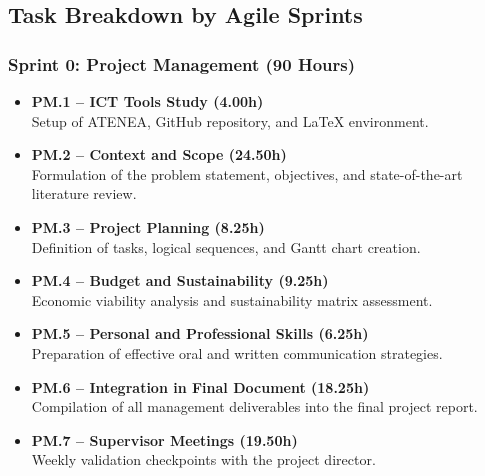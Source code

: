 \subsection{Task Breakdown by Agile Sprints}
\label{subsec:task-breakdown}

\newcommand{\taskitem}[3]{
    \item \textbf{#1 -- #2 (#3)} \\
    {\small #3}
}

\subsubsection*{Sprint 0: Project Management (90 Hours)}
\begin{itemize}[leftmargin=*, itemsep=4pt]
    \item \textbf{PM.1 -- ICT Tools Study (4.00h)} \\
    Setup of ATENEA, GitHub repository, and LaTeX environment.
    \item \textbf{PM.2 -- Context and Scope (24.50h)} \\
    Formulation of the problem statement, objectives, and state-of-the-art literature review.
    \item \textbf{PM.3 -- Project Planning (8.25h)} \\
    Definition of tasks, logical sequences, and Gantt chart creation.
    \item \textbf{PM.4 -- Budget and Sustainability (9.25h)} \\
    Economic viability analysis and sustainability matrix assessment.
    \item \textbf{PM.5 -- Personal and Professional Skills (6.25h)} \\
    Preparation of effective oral and written communication strategies.
    \item \textbf{PM.6 -- Integration in Final Document (18.25h)} \\
    Compilation of all management deliverables into the final project report.
    \item \textbf{PM.7 -- Supervisor Meetings (19.50h)} \\
    Weekly validation checkpoints with the project director.
\end{itemize}

